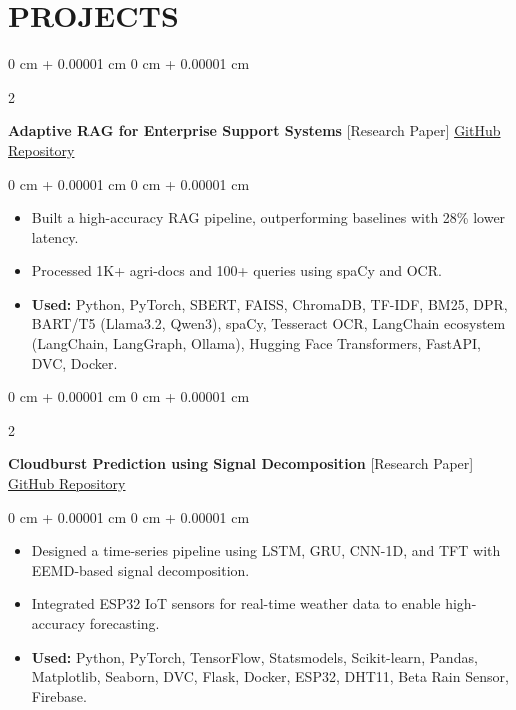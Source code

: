 \documentclass[10pt, letterpaper]{article}
\newenvironment{highlights}{
    \begin{itemize}[
        topsep=0.10 cm,
        parsep=0.10 cm,
        partopsep=0pt,
        itemsep=0pt,
        leftmargin=0 cm + 10pt
    ]
}{
    \end{itemize}
} %
\newenvironment{onecolentry}{
    \begin{adjustwidth}{
        0 cm + 0.00001 cm
    }{
        0 cm + 0.00001 cm
    }
}{
    \end{adjustwidth}
} %
\newenvironment{twocolentry}[2][]{
    \onecolentry
    \def\secondColumn{#2}
    \setcolumnwidth{\fill, 4 cm}
    \begin{paracol}{2}
}{
    \switchcolumn \raggedleft \secondColumn
    \end{paracol}
    \endonecolentry
} %
\begin{document}
    
    \section{PROJECTS}

        \begin{twocolentry}{
            \href{https://github.com/Kshitijk14/rag_for_query_resolution}{GitHub Repository}
        }
            \textbf{Adaptive RAG for Enterprise Support Systems} [Research Paper]\end{twocolentry}

        \vspace{0.10 cm}
        \begin{onecolentry}
            \begin{highlights}
                \item Built a high-accuracy RAG pipeline, outperforming baselines with 28\% lower latency.
                \item Processed 1K+ agri-docs and 100+ queries using spaCy and OCR.
                \item \textbf{Used:} Python, PyTorch, SBERT, FAISS, ChromaDB, TF-IDF, BM25, DPR, BART/T5 (Llama3.2, Qwen3), spaCy, Tesseract OCR, LangChain ecosystem (LangChain, LangGraph, Ollama), Hugging Face Transformers, FastAPI, DVC, Docker.
            \end{highlights}
        \end{onecolentry}


        \vspace{0.2 cm}

        \begin{twocolentry}{
            \href{https://github.com/Kshitijk14/model-cloud-burst}{GitHub Repository}
        }
            \textbf{Cloudburst Prediction using Signal Decomposition} [Research Paper]\end{twocolentry}

        \vspace{0.10 cm}
        \begin{onecolentry}
            \begin{highlights}
                \item Designed a time-series pipeline using LSTM, GRU, CNN-1D, and TFT with EEMD-based signal decomposition.
                \item Integrated ESP32 IoT sensors for real-time weather data to enable high-accuracy forecasting.
                \item \textbf{Used:} Python, PyTorch, TensorFlow, Statsmodels, Scikit-learn, Pandas, Matplotlib, Seaborn, DVC, Flask, Docker, ESP32, DHT11, Beta Rain Sensor, Firebase.
            \end{highlights}
        \end{onecolentry}
\end{document}
